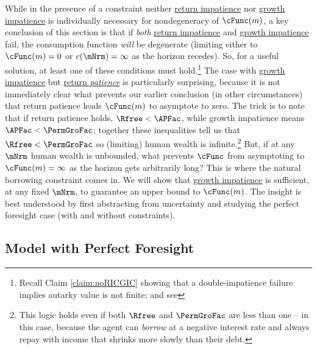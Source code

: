 \documentclass[\econtexRoot/BufferStockTheory]{subfiles}
\begin{document}
While in the presence of a constraint neither \hyperlink{RIC}{return impatience} nor \hyperlink{GICRaw}{growth impatience} is individually necessary for nondegeneracy of $\cFunc(m)$, a key conclusion of this section is that if \emph{both} \hyperlink{RIC}{return impatience} and \hyperlink{GICRaw}{growth impatience} fail, the consumption function \emph{will} be degenerate (limiting either to $\cFunc(m)=0$ or $c(\mNrm)=\infty$ as the horizon recedes).
So, for a useful solution, at least one of these conditions must hold.\footnote{Recall Claim \ref{claim:noRICGIC} showing that a double-impatience failure implies autarky value is not finite; and see } The case with \hyperlink{GICRaw}{growth impatience} but \hyperlink{RIC}{return \emph{patience}} is particularly surprising, because it is not immediately clear what prevents our earlier conclusion (in other circumstances) that return patience leads $\cFunc(m)$ to asymptote to zero.
The trick is to note that if return patience holds, $\Rfree < \APFac$, while growth impatience means $\APFac < \PermGroFac$; together these inequalities tell us that $\Rfree < \PermGroFac$ so (limiting) human wealth is infinite.\footnote{This logic holds even if both $\Rfree$ and $\PermGroFac$ are less than one -- in this case, because the agent can \emph{borrow} at a negative interest rate and always repay with income that shrinks more slowly than their debt.}
But, if at any $\mNrm$ human wealth is unbounded, what prevents $\cFunc$ from asymptoting to $\cFunc(m)=\infty$ as the horizon gets arbitrarily long?
This is where the natural borrowing constraint comes in.
We will show that \hyperlink{GICRaw}{growth impatience} is sufficient, at any fixed $\mNrm$, to guarantee an upper bound to $\cFunc(m)$.
The insight is best understood by first abstracting from uncertainty and studying the perfect foresight case (with and without constraints).

\subsection{Model with Perfect Foresight}\label{subsec:PFBdiscussion}

\hypertarget{ValuePFAnalytical}{}
\hypertarget{Autarky-Value-PF}{}

\end{document}
